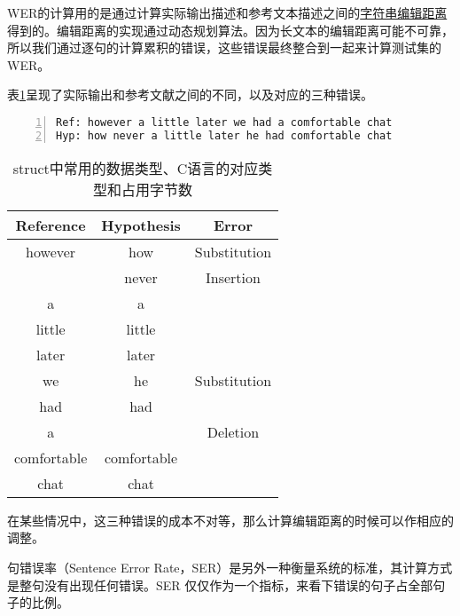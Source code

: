 WER的计算用的是通过计算实际输出描述和参考文本描述之间的\href{https://en.wikipedia.org/wiki/Edit_distance}{字符串编辑距离}得到的。编辑距离的实现通过动态规划算法。因为长文本的编辑距离可能不可靠，所以我们通过逐句的计算累积的错误，这些错误最终整合到一起来计算测试集的WER。

表\ref{tab:wer}呈现了实际输出和参考文献之间的不同，以及对应的三种错误。
\begin{lstlisting}[language = python, numbers=left, 
         numberstyle=\tiny,keywordstyle=\color{blue!70},
         commentstyle=\color{red!50!green!50!blue!50},frame=shadowbox,
         rulesepcolor=\color{red!20!green!20!blue!20},basicstyle=\ttfamily]
Ref: however a little later we had a comfortable chat
Hyp: how never a little later he had comfortable chat
\end{lstlisting}
\begin{table}[h]
 \centering
 \caption{struct中常用的数据类型、C语言的对应类型和占用字节数}
   \begin{tabular*}{1\textwidth}{@{\extracolsep{\fill}}ccc}
   \toprule
    {\bf Reference} & {\bf Hypothesis} & {\bf Error} \\
   \midrule
   however      &        how  & Substitution \\ \hline
                &      never  &  Insertion   \\ \hline
         a      &          a  &              \\ \hline
    little      &     little  &              \\ \hline
    later       &      later  &              \\ \hline
    we          &         he  & Substitution  \\ \hline
    had         &        had  &              \\ \hline
    a           &             &   Deletion   \\ \hline
	comfortable & comfortable &              \\ \hline
      chat &       chat       &              \\
   \bottomrule
   \end{tabular*}%
 \label{tab:wer}%
\end{table}%

在某些情况中，这三种错误的成本不对等，那么计算编辑距离的时候可以作相应的调整。

句错误率（Sentence Error Rate，SER）是另外一种衡量系统的标准，其计算方式是整句没有出现任何错误。SER 仅仅作为一个指标，来看下错误的句子占全部句子的比例。

